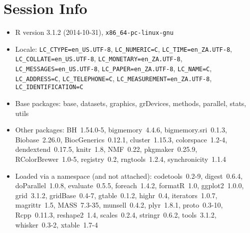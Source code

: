 \documentclass[a4paper]{article}\usepackage[]{graphicx}\usepackage[]{color}
\begin{document}
\section{Session Info}
\begin{itemize}\raggedright
  \item R version 3.1.2 (2014-10-31), \verb|x86_64-pc-linux-gnu|
  \item Locale: \verb|LC_CTYPE=en_US.UTF-8|, \verb|LC_NUMERIC=C|, \verb|LC_TIME=en_ZA.UTF-8|, \verb|LC_COLLATE=en_US.UTF-8|, \verb|LC_MONETARY=en_ZA.UTF-8|, \verb|LC_MESSAGES=en_US.UTF-8|, \verb|LC_PAPER=en_ZA.UTF-8|, \verb|LC_NAME=C|, \verb|LC_ADDRESS=C|, \verb|LC_TELEPHONE=C|, \verb|LC_MEASUREMENT=en_ZA.UTF-8|, \verb|LC_IDENTIFICATION=C|
  \item Base packages: base, datasets, graphics, grDevices,
    methods, parallel, stats, utils
  \item Other packages: BH~1.54.0-5, bigmemory~4.4.6,
    bigmemory.sri~0.1.3, Biobase~2.26.0, BiocGenerics~0.12.1,
    cluster~1.15.3, colorspace~1.2-4, dendextend~0.17.5,
    knitr~1.8, NMF~0.22, pkgmaker~0.25.9, RColorBrewer~1.0-5,
    registry~0.2, rngtools~1.2.4, synchronicity~1.1.4
  \item Loaded via a namespace (and not attached):
    codetools~0.2-9, digest~0.6.4, doParallel~1.0.8,
    evaluate~0.5.5, foreach~1.4.2, formatR~1.0, ggplot2~1.0.0,
    grid~3.1.2, gridBase~0.4-7, gtable~0.1.2, highr~0.4,
    iterators~1.0.7, magrittr~1.5, MASS~7.3-35, munsell~0.4.2,
    plyr~1.8.1, proto~0.3-10, Rcpp~0.11.3, reshape2~1.4,
    scales~0.2.4, stringr~0.6.2, tools~3.1.2, whisker~0.3-2,
    xtable~1.7-4
\end{itemize}


\printbibliography[heading=bibintoc]
\end{document}
